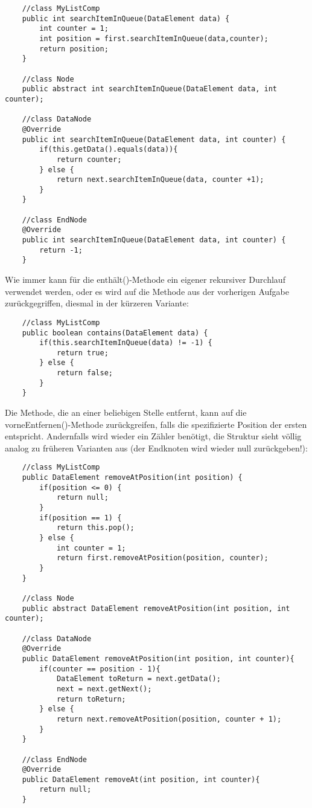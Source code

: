 \documentclass{article}
\begin{document}
\begin{verbatim}
    //class MyListComp
    public int searchItemInQueue(DataElement data) {
        int counter = 1;
        int position = first.searchItemInQueue(data,counter);
        return position;
    }

    //class Node 
    public abstract int searchItemInQueue(DataElement data, int counter);

    //class DataNode 
    @Override
    public int searchItemInQueue(DataElement data, int counter) {
        if(this.getData().equals(data)){
            return counter;
        } else {
            return next.searchItemInQueue(data, counter +1);
        }
    }

    //class EndNode 
    @Override
    public int searchItemInQueue(DataElement data, int counter) {
        return -1;
    }
\end{verbatim}
Wie immer kann für die enthält()-Methode ein eigener rekursiver Durchlauf verwendet werden, oder es wird auf die Methode aus der vorherigen Aufgabe zurückgegriffen, diesmal in der kürzeren Variante: 
\begin{verbatim}
    //class MyListComp 
    public boolean contains(DataElement data) {
        if(this.searchItemInQueue(data) != -1) {
            return true;
        } else {
            return false;
        }
    }
\end{verbatim}
Die Methode, die an einer beliebigen Stelle entfernt, kann auf die vorneEntfernen()-Methode zurückgreifen, falls die spezifizierte Position der ersten entspricht. Andernfalls wird wieder ein Zähler benötigt, die Struktur sieht völlig analog zu früheren Varianten aus (der Endknoten wird wieder null zurückgeben!): 
\begin{verbatim}
    //class MyListComp 
    public DataElement removeAtPosition(int position) {
        if(position <= 0) {
            return null;
        }
        if(position == 1) {
            return this.pop();
        } else {
            int counter = 1;
            return first.removeAtPosition(position, counter);
        }
    }

    //class Node 
    public abstract DataElement removeAtPosition(int position, int counter);

    //class DataNode 
    @Override
    public DataElement removeAtPosition(int position, int counter){
        if(counter == position - 1){
            DataElement toReturn = next.getData();
            next = next.getNext();
            return toReturn; 
        } else {
            return next.removeAtPosition(position, counter + 1);
        }
    }

    //class EndNode 
    @Override
    public DataElement removeAt(int position, int counter){
        return null;
    }
\end{verbatim}
\end{document}
